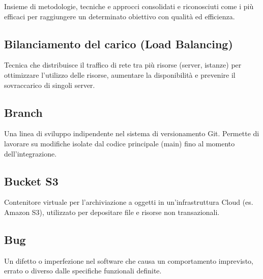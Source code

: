 \documentclass[a4paper, 11pt, oneside]{scrartcl} %
\begin{document}

Insieme di metodologie, tecniche e approcci consolidati e riconosciuti come i più efficaci per raggiungere un determinato obiettivo con qualità ed efficienza.

\vspace{0.5cm}

\subsection*{Bilanciamento del carico (Load Balancing)}


Tecnica che distribuisce il traffico di rete tra più risorse (server, istanze) per ottimizzare l'utilizzo delle risorse, aumentare la disponibilità e prevenire il sovraccarico di singoli server.

\vspace{0.5cm}

\subsection*{Branch}


Una linea di sviluppo indipendente nel sistema di versionamento Git. Permette di lavorare su modifiche isolate dal codice principale (main) fino al momento dell'integrazione.

\vspace{0.5cm}

\subsection*{Bucket S3}
Contenitore virtuale per l'archiviazione a oggetti in un'infrastruttura Cloud (es. Amazon S3), utilizzato per depositare file e risorse non transazionali.
\vspace{0.5cm}

\subsection*{Bug}
Un difetto o imperfezione nel software che causa un comportamento imprevisto, errato o diverso dalle specifiche funzionali definite.
\vspace{0.5cm}
\end{document}
